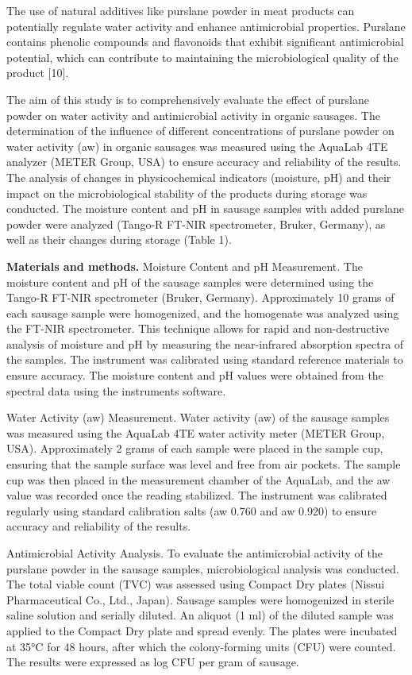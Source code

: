 \begin{multicols}{2}
The use of natural additives like purslane powder in meat products can
potentially regulate water activity and enhance antimicrobial
properties. Purslane contains phenolic compounds and flavonoids that
exhibit significant antimicrobial potential, which can contribute to
maintaining the microbiological quality of the product {[}10{]}.

The aim of this study is to comprehensively evaluate the effect of
purslane powder on water activity and antimicrobial activity in organic
sausages. The determination of the influence of different concentrations
of purslane powder on water activity (aw) in organic sausages was
measured using the AquaLab 4TE analyzer (METER Group, USA) to ensure
accuracy and reliability of the results. The analysis of changes in
physicochemical indicators (moisture, pH) and their impact on the
microbiological stability of the products during storage was conducted.
The moisture content and pH in sausage samples with added purslane
powder were analyzed (Tango-R FT-NIR spectrometer, Bruker, Germany), as
well as their changes during storage (Table 1).

{\bfseries Materials and methods.} Moisture Content and pH Measurement. The
moisture content and pH of the sausage samples were determined using the
Tango-R FT-NIR spectrometer (Bruker, Germany). Approximately 10 grams of
each sausage sample were homogenized, and the homogenate was analyzed
using the FT-NIR spectrometer. This technique allows for rapid and
non-destructive analysis of moisture and pH by measuring the
near-infrared absorption spectra of the samples. The instrument was
calibrated using standard reference materials to ensure accuracy. The
moisture content and pH values were obtained from the spectral data
using the instrument\textquotesingle s software.

Water Activity (aw) Measurement. Water activity (aw) of the sausage
samples was measured using the AquaLab 4TE water activity meter (METER
Group, USA). Approximately 2 grams of each sample were placed in the
sample cup, ensuring that the sample surface was level and free from air
pockets. The sample cup was then placed in the measurement chamber of
the AquaLab, and the aw value was recorded once the reading stabilized.
The instrument was calibrated regularly using standard calibration salts
(aw 0.760 and aw 0.920) to ensure accuracy and reliability of the
results.

Antimicrobial Activity Analysis. To evaluate the antimicrobial activity
of the purslane powder in the sausage samples, microbiological analysis
was conducted. The total viable count (TVC) was assessed using Compact
Dry plates (Nissui Pharmaceutical Co., Ltd., Japan). Sausage samples
were homogenized in sterile saline solution and serially diluted. An
aliquot (1 ml) of the diluted sample was applied to the Compact Dry
plate and spread evenly. The plates were incubated at 35°C for 48 hours,
after which the colony-forming units (CFU) were counted. The results
were expressed as log CFU per gram of sausage.


\end{multicols}
